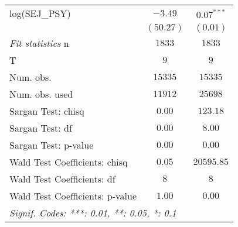\begin{tabular}{lcc}
    log(SEJ\_PSY)                   & $-3.49$                           & $0.07^{***}$        \\
                                    & $(50.27)$                         & $(0.01)$            \\
    \midrule
    \emph{Fit statistics}
    n                               & $1833$                            & $1833$              \\
    T                               & $9$                               & $9$                 \\
    Num. obs.                       & $15335$                           & $15335$             \\
    Num. obs. used                  & $11912$                           & $25698$             \\
    Sargan Test: chisq              & $0.00$                            & $123.18$            \\
    Sargan Test: df                 & $0.00$                            & $8.00$              \\
    Sargan Test: p-value            & $0.00$                            & $0.00$              \\
    Wald Test Coefficients: chisq   & $0.05$                            & $20595.85$          \\
    Wald Test Coefficients: df      & $8$                               & $8$                 \\
    Wald Test Coefficients: p-value & $1.00$                            & $0.00$              \\
    \midrule \midrule
    \multicolumn{3}{l}{\emph{Signif. Codes: ***: 0.01, **: 0.05, *: 0.1}}                     \\
\end{tabular}
\par\endgroup

